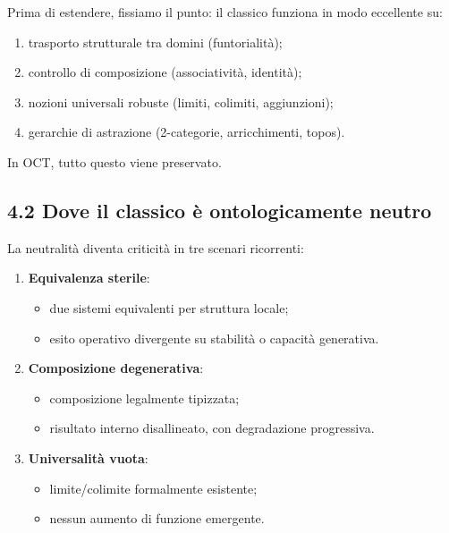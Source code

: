Prima di estendere, fissiamo il punto: il classico funziona in modo eccellente su:

\begin{enumerate}
\def\labelenumi{\arabic{enumi}.}
\tightlist
\item
  trasporto strutturale tra domini (funtorialità);
\item
  controllo di composizione (associatività, identità);
\item
  nozioni universali robuste (limiti, colimiti, aggiunzioni);
\item
  gerarchie di astrazione (2-categorie, arricchimenti, topos).
\end{enumerate}

In OCT, tutto questo viene preservato.

\subsection{4.2 Dove il classico è ontologicamente neutro}

La neutralità diventa criticità in tre scenari ricorrenti:

\begin{enumerate}
\def\labelenumi{\arabic{enumi}.}
\tightlist
\item
  \textbf{Equivalenza sterile}:

  \begin{itemize}
  \tightlist
  \item
    due sistemi equivalenti per struttura locale;
  \item
    esito operativo divergente su stabilità o capacità generativa.
  \end{itemize}
\item
  \textbf{Composizione degenerativa}:

  \begin{itemize}
  \tightlist
  \item
    composizione legalmente tipizzata;
  \item
    risultato interno disallineato, con degradazione progressiva.
  \end{itemize}
\item
  \textbf{Universalità vuota}:

  \begin{itemize}
  \tightlist
  \item
    limite/colimite formalmente esistente;
  \item
    nessun aumento di funzione emergente.
  \end{itemize}
\end{enumerate}

